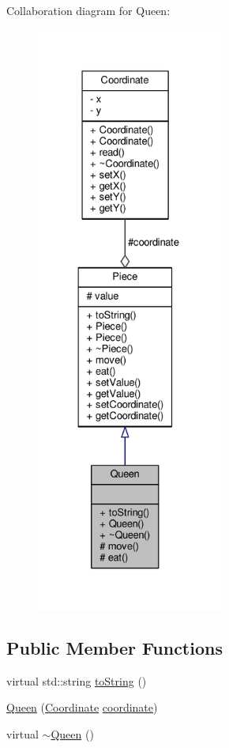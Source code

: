 Collaboration diagram for Queen\+:
\nopagebreak
\begin{figure}[H]
\begin{center}
\leavevmode
\includegraphics[height=550pt]{class_queen__coll__graph}
\end{center}
\end{figure}
\subsection*{Public Member Functions}
\begin{DoxyCompactItemize}
\item 
virtual std\+::string \hyperlink{class_queen_a1cf5f21870e6b2ec107a9e3280a69da6}{to\+String} ()
\item 
\hyperlink{class_queen_ab0d98820ff74906af19e0b7495348f8b}{Queen} (\hyperlink{class_coordinate}{Coordinate} \hyperlink{class_piece_a9e92373c8fffc1f5efb20d62204b70cf}{coordinate})
\item 
virtual \hyperlink{class_queen_aa22f6c1a49a583b549bd1f940e50721d}{$\sim$\+Queen} ()
\end{DoxyCompactItemize}

